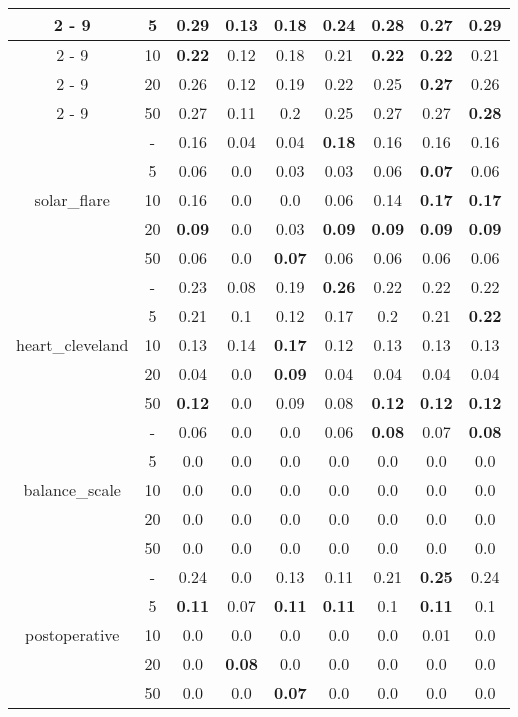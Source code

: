 \documentclass{article}%
\begin{document}
\begin{longtable}{c|c|ccccccc}
\cline{2%
-%
9}%
&5&\textbf{0.29}&0.13&0.18&0.24&0.28&0.27&\textbf{0.29}\\%
\cline{2%
-%
9}%
&10&\textbf{0.22}&0.12&0.18&0.21&\textbf{0.22}&\textbf{0.22}&0.21\\%
\cline{2%
-%
9}%
&20&0.26&0.12&0.19&0.22&0.25&\textbf{0.27}&0.26\\%
\cline{2%
-%
9}%
&50&0.27&0.11&0.2&0.25&0.27&0.27&\textbf{0.28}\\%
\hline%
\multirow{5}{*}{solar\_flare}&{-}&0.16&0.04&0.04&\textbf{0.18}&0.16&0.16&0.16\\%
\cline{2%
-%
9}%
&5&0.06&0.0&0.03&0.03&0.06&\textbf{0.07}&0.06\\%
\cline{2%
-%
9}%
&10&0.16&0.0&0.0&0.06&0.14&\textbf{0.17}&\textbf{0.17}\\%
\cline{2%
-%
9}%
&20&\textbf{0.09}&0.0&0.03&\textbf{0.09}&\textbf{0.09}&\textbf{0.09}&\textbf{0.09}\\%
\cline{2%
-%
9}%
&50&0.06&0.0&\textbf{0.07}&0.06&0.06&0.06&0.06\\%
\hline%
\multirow{5}{*}{heart\_cleveland}&{-}&0.23&0.08&0.19&\textbf{0.26}&0.22&0.22&0.22\\%
\cline{2%
-%
9}%
&5&0.21&0.1&0.12&0.17&0.2&0.21&\textbf{0.22}\\%
\cline{2%
-%
9}%
&10&0.13&0.14&\textbf{0.17}&0.12&0.13&0.13&0.13\\%
\cline{2%
-%
9}%
&20&0.04&0.0&\textbf{0.09}&0.04&0.04&0.04&0.04\\%
\cline{2%
-%
9}%
&50&\textbf{0.12}&0.0&0.09&0.08&\textbf{0.12}&\textbf{0.12}&\textbf{0.12}\\%
\hline%
\multirow{5}{*}{balance\_scale}&{-}&0.06&0.0&0.0&0.06&\textbf{0.08}&0.07&\textbf{0.08}\\%
\cline{2%
-%
9}%
&5&0.0&0.0&0.0&0.0&0.0&0.0&0.0\\%
\cline{2%
-%
9}%
&10&0.0&0.0&0.0&0.0&0.0&0.0&0.0\\%
\cline{2%
-%
9}%
&20&0.0&0.0&0.0&0.0&0.0&0.0&0.0\\%
\cline{2%
-%
9}%
&50&0.0&0.0&0.0&0.0&0.0&0.0&0.0\\%
\hline%
\multirow{5}{*}{postoperative}&{-}&0.24&0.0&0.13&0.11&0.21&\textbf{0.25}&0.24\\%
\cline{2%
-%
9}%
&5&\textbf{0.11}&0.07&\textbf{0.11}&\textbf{0.11}&0.1&\textbf{0.11}&0.1\\%
\cline{2%
-%
9}%
&10&0.0&0.0&0.0&0.0&0.0&0.01&0.0\\%
\cline{2%
-%
9}%
&20&0.0&\textbf{0.08}&0.0&0.0&0.0&0.0&0.0\\%
\cline{2%
-%
9}%
&50&0.0&0.0&\textbf{0.07}&0.0&0.0&0.0&0.0\\%
\hline%
\end{longtable}
\end{document}
